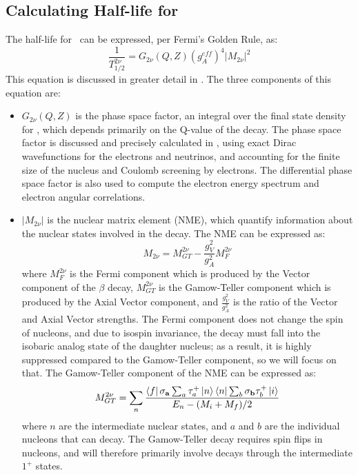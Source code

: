 \documentclass[/main.tex]{subfiles}
\begin{document}
\subsection{Calculating Half-life for \tnbb}
The half-life for \tnbb\ can be expressed, per Fermi's Golden Rule, as:
\begin{equation} \label{eq:2nvvHL}
  \frac{1}{T^{2\nu}_{1/2}}=G_{2\nu}(Q,Z)(g^{eff}_A)^4|M_{2\nu}|^2
\end{equation}
This equation is discussed in greater detail in \cite{Saakyan2013, Engel2017}.
The three components of this equation are:
\begin{itemize}
\item $G_{2\nu}(Q,Z)$ is the phase space factor, an integral over the final state density for \tnbb, which depends primarily on the Q-value of the decay.
  The phase space factor is discussed and precisely calculated in \cite{Kotila2012, mirea2015, stoica2019}, using exact Dirac wavefunctions for the electrons and neutrinos, and accounting for the finite size of the nucleus and Coulomb screening by electrons.
  The differential phase space factor is also used to compute the electron energy spectrum and electron angular correlations.
\item $|M_{2\nu}|$ is the nuclear matrix element (NME), which quantify information about the nuclear states involved in the decay.
  The NME can be expressed as:
  \begin{equation}
    M_{2\nu}=M^{2\nu}_{GT} - \frac{g_V^2}{g_A^2}M^{2\nu}_F
  \end{equation}
  where $M^{2\nu}_F$ is the Fermi component which is produced by the Vector component of the $\beta$ decay, $M^{2\nu}_{GT}$ is the Gamow-Teller component which is produced by the Axial Vector component, and $\frac{g_V^2}{g_A^2}$ is the ratio of the Vector and Axial Vector strengths.
  The Fermi component does not change the spin of nucleons, and due to isospin invariance, the decay must fall into the isobaric analog state of the daughter nucleus; as a result, it is highly suppressed compared to the Gamow-Teller component, so we will focus on that.
  The Gamow-Teller component of the NME can be expressed as:
  \begin{equation}
    M^{2\nu}_{GT}=\sum_n\frac{\bra{f}\mathbf{\sigma_a}\sum_a\tau^+_a\ket{n}\bra{n}\sum_b\mathbf{\sigma_b}\tau^+_b\ket{i}}{E_n-(M_i+M_f)/2}
  \end{equation}
  where $n$ are the intermediate nuclear states, and $a$ and $b$ are the individual nucleons that can decay.
  The Gamow-Teller decay requires spin flips in nucleons, and will therefore primarily involve decays through the intermediate $1^+$ states.

\end{itemize}
\end{document}
